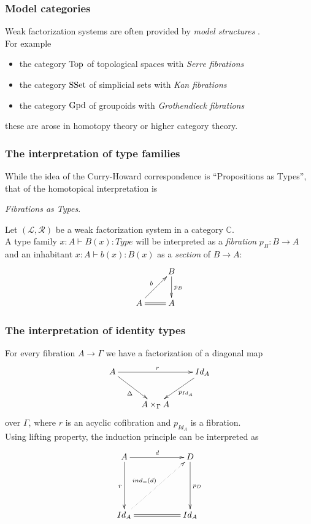 \documentclass[dvipdfmx]{beamer}
\begin{document}
\begin{frame}
  \frametitle{Model categories}
  Weak factorization systems are often provided
  by {\it model structures}
  \nocite{Quillen:1967,hovey2007model}.
  \\
  For example
  \begin{itemize}
    \item the category ${\rm Top}$ of topological spaces
      with {\it Serre fibrations}
    \item the category ${\rm SSet}$ of simplicial sets
      with {\it Kan fibrations}
    \item the category ${\rm Gpd}$ of groupoids
      with {\it Grothendieck fibrations}
  \end{itemize}
  these are arose in homotopy theory or
  higher category theory.
\end{frame}

\begin{frame}
  \frametitle{The interpretation of type families}
  While the idea of the Curry-Howard correspondence is
  ``Propositions as Types'',
  that of the homotopical interpretation is
  \begin{center}
    {\it Fibrations as Types}.
  \end{center}
  Let $\left( {\mathcal L} , {\mathcal R} \right)$
  be a weak factorization system in a category ${\mathbb C}$.
  \\
  A type family $x : A \vdash B \left( x \right) : Type$
  will be interpreted as a {\it fibration} $p_{B} : B \to A$
  and an inhabitant
  $x : A \vdash b \left( x \right) : B \left( x \right)$
  as a {\it section} of
  $B \to A$:
  \[
    \xymatrix{
      & B \ar[d]^{p_{B}}
      \\
      A \ar@{=}[r] \ar[ur]^{b}
      & A
    }
  \]
\end{frame}

\begin{frame}
  \frametitle{The interpretation of identity types}
  For every fibration $A \to \Gamma$
  we have a factorization of a diagonal map
  \[
    \xymatrix{
      A \ar[rr]^{r} \ar[dr]_{\Delta}
      &
      & Id_{A} \ar[dl]^{p_{Id_A}}
      \\
      & A \times _{\Gamma}  A
      &
    }
  \]
  over $\Gamma$, where $r$ is an acyclic cofibration
  and $p_{Id_A}$ is a fibration.
  \\
  Using lifting property,
  the induction principle can be interpreted as
  \[
    \xymatrix{
      A \ar[rr]^{d} \ar[dd]_{r}
      &
      & D \ar[dd]^{p_{D}}
      \\
      & & \\
      Id_{A} \ar@{=}[rr] \ar@{.>}[urur]^{ind_{=} \left( d \right)}
      &
      & Id_{A}
    }
  \]
\end{frame}
\end{document}
